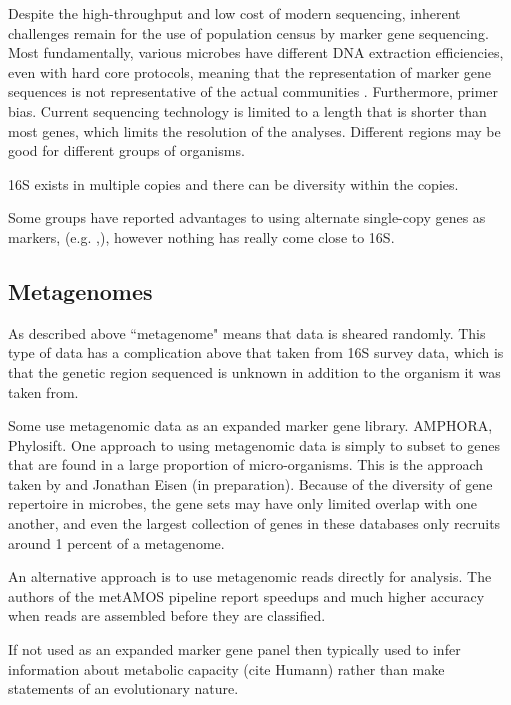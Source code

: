 \documentclass{amsart}
\begin{document}
Despite the high-throughput and low cost of modern sequencing, inherent challenges remain for the use of population census by marker gene sequencing.
Most fundamentally, various microbes have different DNA extraction efficiencies, even with hard core protocols, meaning that the representation of marker gene sequences is not representative of the actual communities \cite{morgan2010metagenomic}.
Furthermore, primer bias.
Current sequencing technology is limited to a length that is shorter than most genes, which limits the resolution of the analyses.
Different regions may be good for different groups of organisms.

16S exists in multiple copies and there can be diversity within the copies.
\citet{kembel2012incorporating}

Some groups have reported advantages to using alternate single-copy genes as markers, (e.g. \cite{case2007rpob},\cite{mcnabb2004hsp65}), however nothing has really come close to 16S.


\subsection{Metagenomes}

As described above ``metagenome" means that data is sheared randomly.
This type of data has a complication above that taken from 16S survey data, which is that the genetic region sequenced is unknown in addition to the organism it was taken from.

Some use metagenomic data as an expanded marker gene library.
\cite{kembel2011phylogenetic}
AMPHORA, Phylosift.
One approach to using metagenomic data is simply to subset to genes that are found in a large proportion of micro-organisms.
This is the approach taken by \citep{von2007quantitative,stark2010mltreemap} and Jonathan Eisen \citep{wu2008amphora} (in preparation).
Because of the diversity of gene repertoire in microbes, the gene sets may have only limited overlap with one another, and even the largest collection of genes in these databases only recruits around 1 percent of a metagenome.

An alternative approach is to use metagenomic reads directly for analysis.
The authors of the metAMOS pipeline \cite{treangen2013metamos} report speedups and much higher accuracy when reads are assembled before they are classified.

If not used as an expanded marker gene panel then typically used to infer information about metabolic capacity (cite Humann) rather than make statements of an evolutionary nature.
\end{document}
